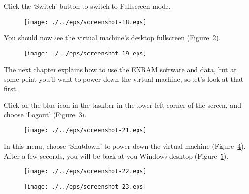Click the `Switch' button to switch to Fullscreen mode.

\begin{figure}[ht]
  \centering
    \texttt{[image: ./../eps/screenshot-18.eps]}
  \caption{}
  \label{fig:screenshot-18}
\end{figure}

You should now see the virtual machine's desktop fullscreen (Figure~\ref{fig:screenshot-19}).

\begin{figure}[ht]
  \centering
    \texttt{[image: ./../eps/screenshot-19.eps]}
  \caption{}
  \label{fig:screenshot-19}
\end{figure}
\clearpage


The next chapter explains how to use the ENRAM software and data, but at some point you'll want to power down the virtual machine, so let's look at that first.

Click on the blue icon in the taskbar in the lower left corner of the screen, and choose `Logout' (Figure~\ref{fig:screenshot-21}).

\begin{figure}[ht]
  \centering
    \texttt{[image: ./../eps/screenshot-21.eps]}
  \caption{}
  \label{fig:screenshot-21}
\end{figure}
\clearpage

In this menu, choose `Shutdown' to power down the virtual machine (Figure~\ref{fig:screenshot-22}). After a few seconds, you will be back at you Windows desktop (Figure~\ref{fig:screenshot-23}).

\begin{figure}[ht]
  \centering
    \texttt{[image: ./../eps/screenshot-22.eps]}
  \caption{}
  \label{fig:screenshot-22}
\end{figure}

\begin{figure}[hb]
  \centering
    \texttt{[image: ./../eps/screenshot-23.eps]}
  \caption{}
  \label{fig:screenshot-23}
\end{figure}



